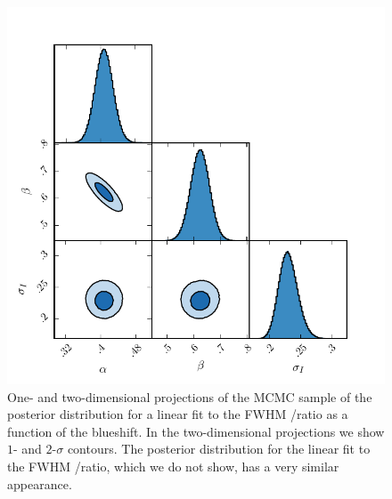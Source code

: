 \begin{figure}[h!]
    \centering
    \includegraphics[width=\textwidth]{figures/chapter03/civ_ha_mcmc_parameters.pdf} 
    \caption[{One- and two-dimensional projections of the MCMC sample of the posterior distribution for a linear fit to the FWHM /\ha ratio as a function of the  blueshift.}]{One- and two-dimensional projections of the MCMC sample of the posterior distribution for a linear fit to the FWHM /\ha ratio as a function of the  blueshift. In the two-dimensional projections we show $1$- and $2$-$\sigma$ contours. The posterior distribution for the linear fit to the FWHM /\hb ratio, which we do not show, has a very similar appearance.} 
    \label{fig:mcmc_parameters}
\end{figure}

